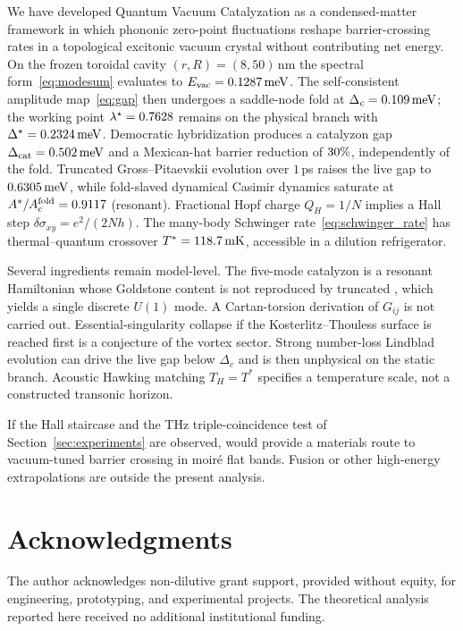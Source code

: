 \documentclass[11pt,letterpaper]{article}
\begin{document}
We have developed Quantum Vacuum Catalyzation as a condensed-matter framework in which phononic zero-point fluctuations reshape barrier-crossing rates in a topological excitonic vacuum crystal without contributing net energy. On the frozen toroidal cavity $(r,R)=(8,50)$\,nm the spectral form~\eqref{eq:modesum} evaluates to $E_{\mathrm{vac}}=0.1287\,\mathrm{meV}$. The self-consistent amplitude map~\eqref{eq:gap} then undergoes a saddle-node fold at $\Delta_c=0.109\,\mathrm{meV}$; the working point $\lambda^\star=0.7628$ remains on the physical branch with $\Delta^\star=0.2324\,\mathrm{meV}$. Democratic hybridization produces a catalyzon gap $\Delta_{\mathrm{cat}}=0.502\,\mathrm{meV}$ and a Mexican-hat barrier reduction of $30\%$, independently of the fold. Truncated Gross--Pitaevskii evolution over $1$\,ps raises the live gap to $0.6305\,\mathrm{meV}$, while fold-slaved dynamical Casimir dynamics saturate at $A^*/A_c^{\mathrm{fold}}=0.9117$ (resonant). Fractional Hopf charge $Q_H=1/N$ implies a Hall step $\delta\sigma_{xy}=e^2/(2Nh)$. The many-body Schwinger rate~\eqref{eq:schwinger_rate} has thermal--quantum crossover $T^*=118.7\,\mathrm{mK}$, accessible in a dilution refrigerator.

Several ingredients remain model-level. The five-mode catalyzon is a resonant Hamiltonian whose Goldstone content is not reproduced by truncated \TQGL{}, which yields a single discrete $U(1)$ mode. A Cartan-torsion derivation of $G_{ij}$ is not carried out. Essential-singularity collapse if the Kosterlitz--Thouless surface is reached first is a conjecture of the vortex sector. Strong number-loss Lindblad evolution can drive the live gap below $\Delta_c$ and is then unphysical on the static branch. Acoustic Hawking matching $T_H=T^*$ specifies a temperature scale, not a constructed transonic horizon.

If the Hall staircase and the THz triple-coincidence test of Section~\ref{sec:experiments} are observed, \QVC{} would provide a materials route to vacuum-tuned barrier crossing in moir\'e flat bands. Fusion or other high-energy extrapolations are outside the present analysis.

\section*{Acknowledgments}

The author acknowledges non-dilutive grant support, provided without equity, for engineering, prototyping, and experimental projects. The theoretical analysis reported here received no additional institutional funding.
\end{document}
